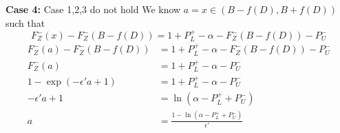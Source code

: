 \documentclass[11pt]{scrartcl} %
\begin{document}
\begin{appendices}
	\textbf{Case 4:} Case 1,2,3 do not hold \newline
	We know $a =  x \in (B - f(D), B + f(D))$ such that
	\[ F_{Z}^{-}(x) - F_{Z}^{-}(B - f(D)) = 1 + P_{L}^{+} - \alpha - F_{Z}^{-}(B - f(D)) - P_{U}^{-} \]
	\begin{align}
		F_{Z}^{-}(a) - F_{Z}^{-}(B - f(D)) &= 1 + P_{L}^{+} - \alpha - F_{Z}^{-}(B - f(D)) - P_{U}^{-} \nonumber \\
							  F_{Z}^{-}(a) &= 1 + P_{L}^{+} - \alpha - P_{U}^{-} \nonumber \\
				1 - \exp(-\epsilon' a + 1) &= 1 + P_{L}^{+} - \alpha - P_{U}^{-} \nonumber \\
						  -\epsilon' a + 1 &= \ln(\alpha - P_{L}^{+} + P_{U}^{-}) \nonumber \\
						                 a &= \frac{1 - \ln(\alpha - P_{L}^{+} + P_{U}^{-})}{\epsilon'} \nonumber
	\end{align}
\end{appendices}
\end{document}
